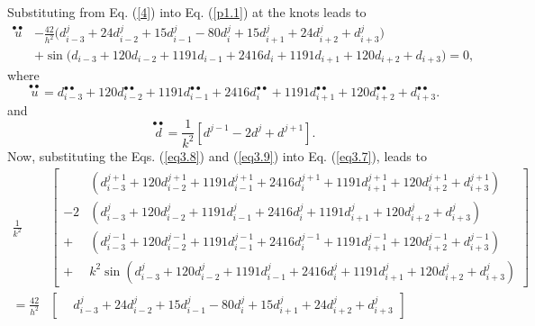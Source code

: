 \documentclass[10pt,letterpaper,twoside]{article}
\begin{document}
Substituting from Eq. (\ref{4}) into Eq. (\ref{p1.1}) at the knots leads to
\begin{equation}\label{eq3.7}
 \begin{aligned}
  \overset{\bullet \bullet }{u} 
  &- \frac{42}{h^2} \bigl(d_{i-3}^{j} + 24d_{i-2}^{j} + 15d_{i-1}^{j} - 80d_i^{j} + 15d_{i+1}^{j} + 24d_{i+2}^{j} + d_{i+3}^{j} \bigr) \\
  &+ \sin\bigl( d_{i-3} +120d_{i-2} + 1191d_{i-1} + 2416d_i + 1191d_{i+1} +120 d_{i+2}+ d_{i+3} \bigr) = 0,
 \end{aligned}
\end{equation}
where 
\begin{equation}
 \overset{\bullet \bullet }{u}=d^{\bullet \bullet}_{i-3}+120d^{\bullet \bullet}_{i-2} + 1191d^{\bullet \bullet}_{i-1} + 2416d^{\bullet \bullet}_i + 1191d^{\bullet \bullet}_{i+1} + 120d^{\bullet \bullet}_{i+2}+d^{\bullet \bullet}_{i+3}.  \label{eq3.8}
\end{equation}
and 
\begin{equation}
 \overset{\bullet \bullet }{d}=\frac{1}{k^{2}}[d^{j-1}-2d^{j}+d^{j+1}].  \label{eq3.9}
\end{equation}
Now, substituting the Eqs. (\ref{eq3.8}) and (\ref{eq3.9}) into Eq. (\ref{eq3.7}), leads to 
\begin{equation}
 \begin{aligned}
  \frac{1}{k^2}
  &\left[
  \begin{aligned}
   &\left(d_{i-3}^{j+1}+120d_{i-2}^{j+1} + 1191d_{i-1}^{j+1} + 2416d_i^{j+1} + 1191d_{i+1}^{j+1} + 120d_{i+2}^{j+1}+d_{i+3}^{j+1}\right) \\
   -2 &\left(d_{i-3}^{j}+120d_{i-2}^{j} + 1191d_{i-1}^{j} + 2416d_i^{j} + 1191d_{i+1}^{j} + 120d_{i+2}^{j}+d_{i+3}^{j}\right)\\
   + &\left(d_{i-3}^{j-1}+120d_{i-2}^{j-1} + 1191d_{i-1}^{j-1} + 2416d_i^{j-1} + 1191d_{i+1}^{j-1} + 120d_{i+2}^{j-1}+d_{i+3}^{j-1}\right) \\
   +& k^{2}\sin \left( d_{i-3}^{j}+120d_{i-2}^{j} + 1191d_{i-1}^{j} + 2416d_i^{j} + 1191d_{i+1}^{j} + 120d_{i+2}^{j}+d_{i+3}^{j} \right)
  \end{aligned}
  \right] \\[1em]
  = \frac{42}{h^2}
  &\left[
  \begin{aligned}
   &d_{i-3}^{j}+ 24d_{i-2}^{j} + 15d_{i-1}^{j} - 80d_i^{j} + 15d_{i+1}^{j} +24 d_{i+2}^{j}+d_{i+3}^{j}
  \end{aligned}
  \right]
 \end{aligned}
\end{equation}
\end{document}

